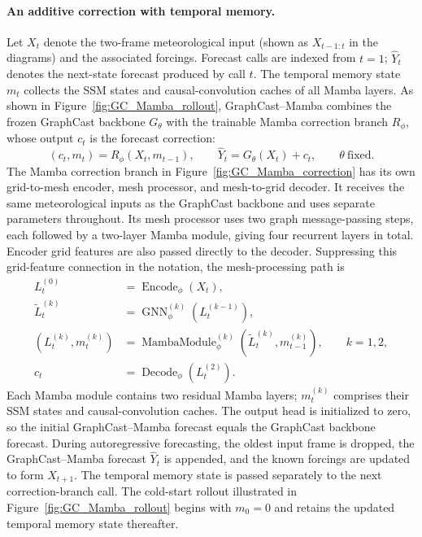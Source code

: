 \documentclass[11pt]{article}
\begin{document}
\paragraph{An additive correction with temporal memory.}
Let $X_t$ denote the two-frame meteorological input (shown as $X_{t-1:t}$ in the diagrams) and the associated forcings. Forecast calls are indexed from $t=1$; $\hat{Y}_t$ denotes the next-state forecast produced by call $t$. The temporal memory state $m_t$ collects the SSM states and causal-convolution caches of all Mamba layers. As shown in Figure~\ref{fig:GC_Mamba_rollout}, {GraphCast--Mamba combines the frozen GraphCast backbone $G_\theta$ with the trainable Mamba correction branch $R_\phi$, whose output $c_t$ is the forecast correction}:
\vspace{-4pt}
\begin{equation}
    (c_t,m_t)=R_\phi(X_t,m_{t-1}),
    \qquad
    \hat{Y}_t=G_\theta(X_t)+c_t,
    \qquad \theta\ \text{fixed}.
    \label{eq:additive_correction}
\end{equation}
{The Mamba correction branch in Figure~\ref{fig:GC_Mamba_correction}} has its own grid-to-mesh encoder, mesh processor, and mesh-to-grid decoder. It receives {the same meteorological inputs as the GraphCast backbone} and uses separate parameters throughout. Its mesh processor uses two graph message-passing steps, each followed by a two-layer Mamba module, giving four recurrent layers in total. Encoder grid features are also passed directly to the decoder. Suppressing this grid-feature connection in the notation, the mesh-processing path is
\begin{align}
    L_t^{(0)} &= \operatorname{Encode}_\phi(X_t),\\
    \widetilde{L}_t^{(k)} &= \operatorname{GNN}^{(k)}_\phi(L_t^{(k-1)}),\\
    (L_t^{(k)},m_t^{(k)})
    &=\operatorname{MambaModule}^{(k)}_\phi
       (\widetilde{L}_t^{(k)},m_{t-1}^{(k)}),\qquad k=1,2,\\
    c_t &= \operatorname{Decode}_\phi(L_t^{(2)}).
\end{align}
{Each Mamba module contains two residual Mamba layers; $m_t^{(k)}$ comprises their SSM states and causal-convolution caches.} The output head is initialized to zero, so {the initial GraphCast--Mamba forecast equals the GraphCast backbone forecast}. During autoregressive forecasting, the oldest input frame is dropped, {the GraphCast--Mamba forecast $\hat{Y}_t$ is appended}, and the known forcings are updated to form $X_{t+1}$. {The temporal memory state is passed separately to the next correction-branch call.} The cold-start rollout illustrated in Figure~\ref{fig:GC_Mamba_rollout} begins with $m_0=0$ and {retains the updated temporal memory state thereafter}.
\end{document}
